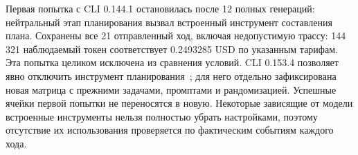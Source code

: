 Первая попытка с CLI 0.144.1 остановилась после 12 полных генераций: нейтральный этап планирования вызвал встроенный инструмент составления плана. Сохранены все 21 отправленный ход, включая недопустимую трассу: 144\,321 наблюдаемый токен соответствует 0.2493285 USD по указанным тарифам. Эта попытка целиком исключена из сравнения условий. CLI 0.153.4 позволяет явно отключить инструмент планирования~\cite{codexrelease2026}; для него отдельно зафиксирована новая матрица с прежними задачами, промптами и рандомизацией. Успешные ячейки первой попытки не переносятся в новую. Некоторые зависящие от модели встроенные инструменты нельзя полностью убрать настройками, поэтому отсутствие их использования проверяется по фактическим событиям каждого хода.


